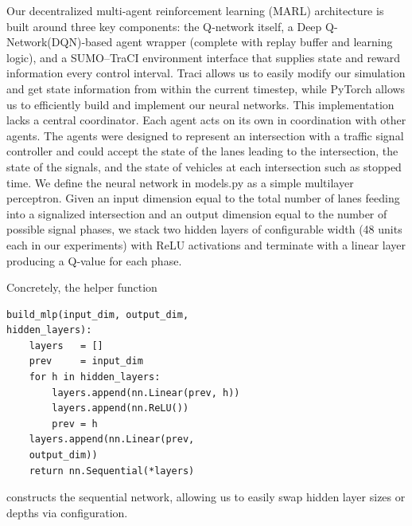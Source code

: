 \documentclass[conference]{IEEEtran}
\begin{document}
Our decentralized multi‐agent reinforcement learning (MARL) architecture is built around three key components: the Q‐network itself, a Deep Q-Network(DQN)‐based agent wrapper (complete with replay buffer and learning logic), and a SUMO–TraCI environment interface that supplies state and reward information every control interval. Traci allows us to easily modify our simulation and get state information from within the current timestep, while PyTorch allows us to efficiently build and implement our neural networks. This implementation lacks a central coordinator. Each agent acts on its own in coordination with other agents. The agents were designed to represent an intersection with a traffic signal controller and could accept the state of the lanes leading to the intersection, the state of the signals, and the state of vehicles at each intersection such as stopped time. We define the neural network in models.py as a simple multilayer perceptron. Given an input dimension equal to the total number of lanes feeding into a signalized intersection and an output dimension equal to the number of possible signal phases, we stack two hidden layers of configurable width (48 units each in our experiments) with ReLU activations and terminate with a linear layer producing a Q‐value for each phase. 
 
Concretely, the helper function
\begin{verbatim}
build_mlp(input_dim, output_dim, 
hidden_layers):
    layers   = []
    prev     = input_dim
    for h in hidden_layers:
        layers.append(nn.Linear(prev, h))
        layers.append(nn.ReLU())
        prev = h
    layers.append(nn.Linear(prev, 
    output_dim))
    return nn.Sequential(*layers)
\end{verbatim}
constructs the sequential network, allowing us to easily swap hidden layer sizes or depths via configuration.
\end{document}
